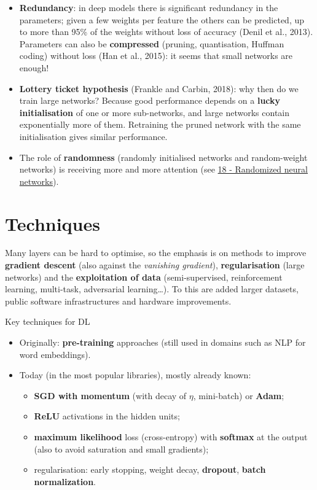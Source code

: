\begin{itemize}
\tightlist
\item
  \textbf{Redundancy}: in deep models there is significant redundancy
  in the parameters; given a few weights per feature the others can be
  predicted, up to more than 95\% of the weights without loss of
  accuracy (Denil et al., 2013). Parameters can also be
  \textbf{compressed} (pruning, quantisation, Huffman coding) without
  loss (Han et al., 2015): it seems that small networks are enough!
\item
  \textbf{Lottery ticket hypothesis} (Frankle and Carbin, 2018): why
  then do we train large networks? Because good performance depends on
  a \textbf{lucky initialisation} of one or more sub-networks, and
  large networks contain exponentially more of them. Retraining the
  pruned network with the same initialisation gives similar
  performance.
\item
  The role of \textbf{randomness} (randomly initialised networks and
  random-weight networks) is receiving more and more attention (see
  \href{18\%20-\%20Reti\%20neurali\%20randomizzate}{18 - Randomized
  neural networks}).
\end{itemize}

\section{Techniques}\label{tecniche}

Many layers can be hard to optimise, so the emphasis is on methods to
improve \textbf{gradient descent} (also against the \emph{vanishing
gradient}), \textbf{regularisation} (large networks) and the
\textbf{exploitation of data} (semi-supervised, reinforcement learning,
multi-task, adversarial learning\ldots). To this are added larger
datasets, public software infrastructures and hardware improvements.

\begin{boxabstract}{Key techniques for DL}

\begin{itemize}
\tightlist
\item
  Originally: \textbf{pre-training} approaches (still used in domains
  such as NLP for word embeddings).
\item
  Today (in the most popular libraries), mostly already known:

  \begin{itemize}
  \tightlist
  \item
    \textbf{SGD with momentum} (with decay of \(\eta\), mini-batch) or
    \textbf{Adam};
  \item
    \textbf{ReLU} activations in the hidden units;
  \item
    \textbf{maximum likelihood} loss (cross-entropy) with
    \textbf{softmax} at the output (also to avoid saturation and small
    gradients);
  \item
    regularisation: early stopping, weight decay, \textbf{dropout},
    \textbf{batch normalization}.
  \end{itemize}
\end{itemize}

\end{boxabstract}

